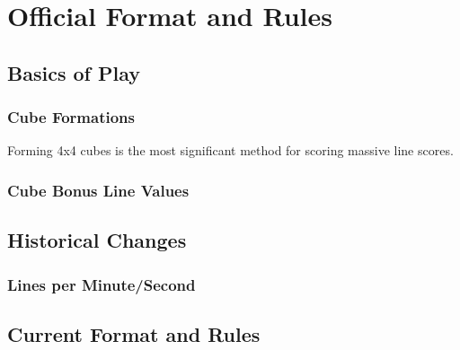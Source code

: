 \part{Official Format and Rules}
  \chapter{Basics of Play}
    \section{Cube Formations}Forming 4x4 cubes is the most significant method for scoring massive line scores. 
    \section{Cube Bonus Line Values}
  \chapter{Historical Changes}
    \section{Lines per Minute/Second}
  \chapter{Current Format and Rules}
